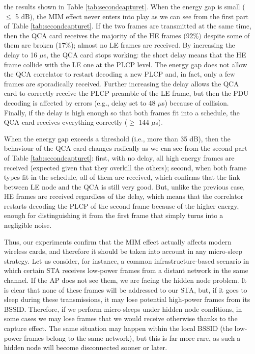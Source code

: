 \documentclass[twoside,nohyper]{tufte-book}
\theoremstyle{definition}
\theoremstyle{definition}
\theoremstyle{definition}
\theoremstyle{remark}
\begin{document}
 the results shown in Table
\ref{tab:secondcapturet}. When the energy gap is small (\(\le\) 5 dB),
the MIM effect never enters into play as we can see from the first part
of Table \ref{tab:secondcapturet}. If the two frames are transmitted at
the same time, then the QCA card receives the majority of the HE frames
(92\%) despite some of them are broken (17\%); almost no LE frames are
received. By increasing the delay to 16 \(\mu\)s, the QCA card stops
working: the short delay means that the HE frame collide with the LE one
at the PLCP level. The energy gap does not allow the QCA correlator to
restart decoding a new PLCP and, in fact, only a few frames are
sporadically received. Further increasing the delay allows the QCA card
to correctly receive the PLCP preamble of the LE frame, but then the PDU
decoding is affected by errors (e.g., delay set to 48 \(\mu\)s) because
of collision. Finally, if the delay is high enough so that both frames
fit into a schedule, the QCA card receives everything correctly (\(\ge\)
144 \(\mu\)s).

When the energy gap exceeds a threshold (i.e., more than 35 dB), then
the behaviour of the QCA card changes radically as we can see from the
second part of Table \ref{tab:secondcapturet}: first, with no delay, all
high energy frames are received (expected given that they overkill the
others); second, when both frame types fit in the schedule, all of them
are received, which confirms that the link between LE node and the QCA
is still very good. But, unlike the previous case, HE frames are
received regardless of the delay, which means that the correlator
restarts decoding the PLCP of the second frame because of the higher
energy, enough for distinguishing it from the first frame that simply
turns into a negligible noise.

Thus, our experiments confirm that the MIM effect actually affects
modern wireless cards, and therefore it should be taken into account in
any micro-sleep strategy. Let us consider, for instance, a common
infrastructure-based scenario in which certain STA receives low-power
frames from a distant network in the same channel. If the AP does not
see them, we are facing the hidden node problem. It is clear that none
of these frames will be addressed to our STA, but, if it goes to sleep
during these transmissions, it may lose potential high-power frames from
its BSSID. Therefore, if we perform micro-sleeps under hidden node
conditions, in some cases we may lose frames that we would receive
otherwise thanks to the capture effect. The same situation may happen
within the local BSSID (the low-power frames belong to the same
network), but this is far more rare, as such a hidden node will become
disconnected sooner or later.
\end{document}
